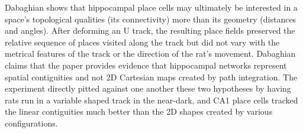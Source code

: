 \documentclass[onecollarge,runningheads]{svjour2}
\begin{document}
Dabaghian \cite{dabaghian2014reconceiving} shows that hippocampal place cells may ultimately be interested in a space's topological qualities (its connectivity) more than its geometry (distances and angles). After deforming an U track, the resulting place fields preserved the relative sequence of places visited along the track but did not vary with the metrical features of the track or the direction of the rat's movement.
Dabaghian claims that the paper provides evidence that hippocampal networks represent spatial contiguities and not 2D Cartesian maps created by path integration. The experiment directly pitted against one another these two hypotheses by having rats run in a variable shaped track in the near-dark, and CA1 place cells tracked the linear contiguities much better than the 2D shapes created by various configurations. 

\begin{acknowledgements}

\end{acknowledgements}


\end{document}
